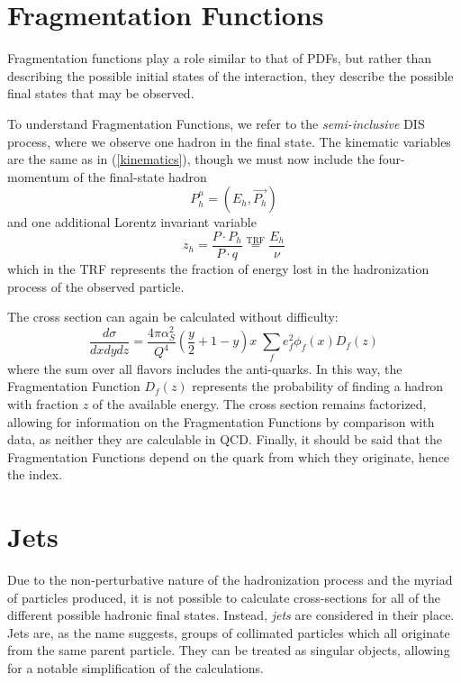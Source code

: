 \documentclass[10pt,a4paper]{book}
\begin{document}
\section{Fragmentation Functions}
Fragmentation functions play a role similar to that of PDFs, but rather than describing the possible initial states of the interaction, they describe the possible final states that may be observed.

To understand Fragmentation Functions, we refer to the \emph{semi-inclusive} DIS process, where we observe one hadron in the final state. The kinematic variables are the same as in (\ref{kinematics}), though we must now include the four-momentum of the final-state hadron
\begin{equation}
P_h^\mu = (E_h, \vec{P_h})
\end{equation} 
and one additional Lorentz invariant variable
\begin{equation}
z_h = \frac{P \cdot P_h}{P \cdot q} \overset{\mathrm{TRF}}{=} \frac{E_h}{\nu}
\end{equation}
which in the TRF represents the fraction of energy lost in the hadronization process of the observed particle. 

The cross section can again be calculated without difficulty:
\begin{equation}
\frac{d\sigma}{dx dy dz} = \frac{4\pi\alpha^2_S}{Q^4}\left(\frac{y}{2} + 1 - y\right)x \; \sum_f e_f^2 \phi_f(x) D_f(z)
\label{cross section FF}
\end{equation}
where the sum over all flavors includes the anti-quarks. In this way, the Fragmentation Function $D_f(z)$ represents the probability of finding a hadron with fraction $z$ of the available energy. The cross section remains factorized, allowing for information on the Fragmentation Functions by comparison with data, as neither they are calculable in QCD. Finally, it should be said that the Fragmentation Functions depend on the quark from which they originate, hence the index. 

\section{Jets}
Due to the non-perturbative nature of the hadronization process and the myriad of particles produced, it is not possible to calculate cross-sections for all of the different possible hadronic final states. Instead, \emph{jets} are considered in their place. Jets are, as the name suggests, groups of collimated particles which all originate from the same parent particle. They can be treated as singular objects, allowing for a notable simplification of the calculations. 
\end{document}
